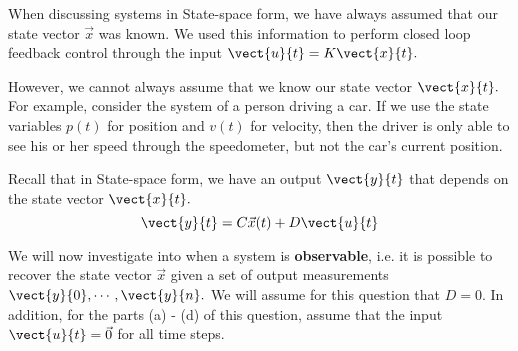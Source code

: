 
When discussing systems in State-space form, we have always assumed that our state vector $\vec{x}$ was known.
We used this information to perform closed loop feedback control through the input $\vect{u}{t} = K \vect{x}{t}.$

However, we cannot always assume that we know our state vector $\vect{x}{t}.$
For example, consider the system of a person driving a car. 
If we use the state variables $p(t)$ for position and $v(t)$ for velocity, then the driver is only able to see his or her speed through the speedometer, but not the car's current position. 

Recall that in State-space form, we have an output $\vect{y}{t}$ that depends on the state vector $\vect{x}{t}.$
\begin{equation}
\vect{y}{t} = C \vec{x}(t) + D \vect{u}{t}
\end{equation}

We will now investigate into when a system is \textbf{observable}, i.e. it is possible to recover the state vector $\vec{x}$ given a set of output measurements $\vect{y}{0}, \cdots, \vect{y}{n}.$ We will assume for this question that $D = 0.$ In addition, for the parts (a) - (d) of this question, assume that the input $\vect{u}{t} = \vec{0}$ for all time steps.


